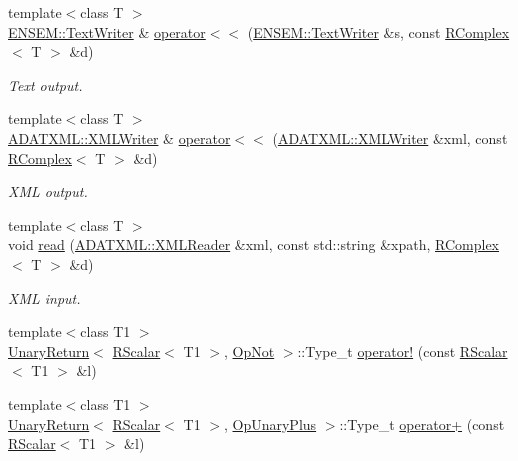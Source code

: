 \begin{DoxyCompactItemize}
{\footnotesize template$<$class T $>$ }\\\mbox{\hyperlink{classENSEM_1_1TextWriter}{E\+N\+S\+E\+M\+::\+Text\+Writer}} \& \mbox{\hyperlink{group__rcomplex_gaddd3f3bfef7fda1dcb327c57c20891bb}{operator$<$$<$}} (\mbox{\hyperlink{classENSEM_1_1TextWriter}{E\+N\+S\+E\+M\+::\+Text\+Writer}} \&s, const \mbox{\hyperlink{classENSEM_1_1RComplex}{R\+Complex}}$<$ T $>$ \&d)
\begin{DoxyCompactList}\small\item\em Text output. \end{DoxyCompactList}\item 
{\footnotesize template$<$class T $>$ }\\\mbox{\hyperlink{classADATXML_1_1XMLWriter}{A\+D\+A\+T\+X\+M\+L\+::\+X\+M\+L\+Writer}} \& \mbox{\hyperlink{group__rcomplex_gaa63187dcbe17285c7d04fd9887d97b6a}{operator$<$$<$}} (\mbox{\hyperlink{classADATXML_1_1XMLWriter}{A\+D\+A\+T\+X\+M\+L\+::\+X\+M\+L\+Writer}} \&xml, const \mbox{\hyperlink{classENSEM_1_1RComplex}{R\+Complex}}$<$ T $>$ \&d)
\begin{DoxyCompactList}\small\item\em X\+ML output. \end{DoxyCompactList}\item 
{\footnotesize template$<$class T $>$ }\\void \mbox{\hyperlink{group__rcomplex_ga4e957daaafbfd0e1b97883627dddd8f7}{read}} (\mbox{\hyperlink{classADATXML_1_1XMLReader}{A\+D\+A\+T\+X\+M\+L\+::\+X\+M\+L\+Reader}} \&xml, const std\+::string \&xpath, \mbox{\hyperlink{classENSEM_1_1RComplex}{R\+Complex}}$<$ T $>$ \&d)
\begin{DoxyCompactList}\small\item\em X\+ML input. \end{DoxyCompactList}\item 
{\footnotesize template$<$class T1 $>$ }\\\mbox{\hyperlink{structENSEM_1_1UnaryReturn}{Unary\+Return}}$<$ \mbox{\hyperlink{classENSEM_1_1RScalar}{R\+Scalar}}$<$ T1 $>$, \mbox{\hyperlink{structENSEM_1_1OpNot}{Op\+Not}} $>$\+::Type\+\_\+t \mbox{\hyperlink{group__rscalar_gaf7f4b83a6f16cb689121bc04a4c6f0e2}{operator!}} (const \mbox{\hyperlink{classENSEM_1_1RScalar}{R\+Scalar}}$<$ T1 $>$ \&l)
\item 
{\footnotesize template$<$class T1 $>$ }\\\mbox{\hyperlink{structENSEM_1_1UnaryReturn}{Unary\+Return}}$<$ \mbox{\hyperlink{classENSEM_1_1RScalar}{R\+Scalar}}$<$ T1 $>$, \mbox{\hyperlink{structENSEM_1_1OpUnaryPlus}{Op\+Unary\+Plus}} $>$\+::Type\+\_\+t \mbox{\hyperlink{group__rscalar_ga2ad5c813070059a7a12cee82d5e2bbae}{operator+}} (const \mbox{\hyperlink{classENSEM_1_1RScalar}{R\+Scalar}}$<$ T1 $>$ \&l)

\end{DoxyCompactItemize}
